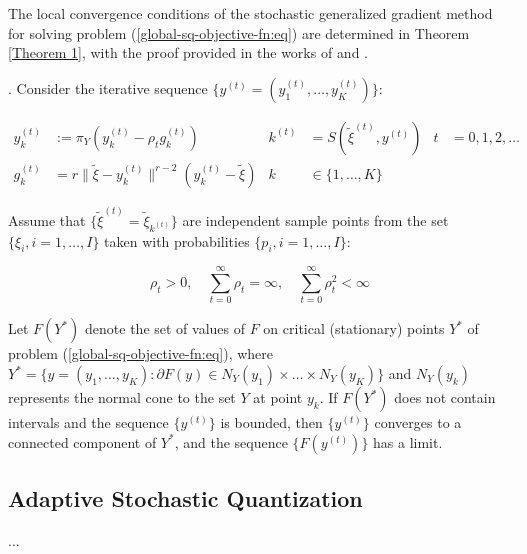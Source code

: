 The local convergence conditions of the stochastic generalized gradient method for solving problem (\ref{global-sq-objective-fn:eq}) are determined in Theorem \ref{Theorem 1}, with the proof provided in the works of \cite{Ermoliev_Norkin_2003} and \cite{Ermolev_Norkin_1998}.

\begin{theorem}
    \label{Theorem 1} \cite{Ermoliev_Norkin_2003,Ermolev_Norkin_1998}. Consider the iterative sequence $ \{ y^{(t)} = (y_1^{(t)}, \ldots, y_K^{(t)}) \} $:

    \begin{align}
        y_k^{(t)} &:= \pi_Y (y_k^{(t)} - \rho_t g_k^{(t)}) & k^{(t)} &= S(\tilde{\xi}^{(t)}, y^{(t)}) & t &= 0, 1, 2, \ldots \nonumber \\
        g_k^{(t)} &= r \| \tilde{\xi} - y_k^{(t)} \|^{r - 2} (y_k^{(t)} - \tilde{\xi}) & k &\in \{ 1, \ldots, K \}
    \end{align}

    Assume that $ \{ \tilde{\xi}^{(t)} = \tilde{\xi}_{k^{(t)}} \} $ are independent sample points from the set $ \{ \xi_i, i = 1, \ldots, I \} $ taken with probabilities $ \{ p_i, i = 1, \ldots, I \} $:

    \begin{equation}
        \rho_t > 0, \quad \sum_{t=0}^{\infty} \rho_t = \infty, \quad \sum_{t=0}^{\infty} \rho_t^2 < \infty
    \end{equation}

    Let $ F(Y^*) $ denote the set of values of $ F $ on critical (stationary) points $ Y^* $ of problem (\ref{global-sq-objective-fn:eq}), where $ Y^* = \{ y = (y_1, \ldots, y_K): \partial F(y) \in N_Y (y_1) \times \ldots \times N_Y (y_K) \} $ and $ N_Y (y_k) $ represents the normal cone to the set $ Y $ at point $ y_k $. If $ F(Y^*) $ does not contain intervals and the sequence $ \{ y^{(t)} \} $ is bounded, then $ \{ y^{(t)} \} $ converges to a connected component of $ Y^* $, and the sequence $ \{ F(y^{(t)}) \} $ has a limit.
\end{theorem}

\subsection{Adaptive Stochastic Quantization}

...
